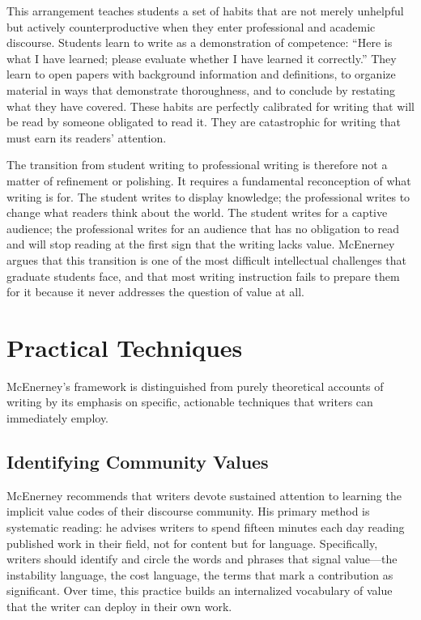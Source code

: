 \documentclass[12pt]{article}
\begin{document}
This arrangement teaches students a set of habits that are not merely unhelpful but actively counterproductive when they enter professional and academic discourse. Students learn to write as a demonstration of competence: ``Here is what I have learned; please evaluate whether I have learned it correctly.'' They learn to open papers with background information and definitions, to organize material in ways that demonstrate thoroughness, and to conclude by restating what they have covered. These habits are perfectly calibrated for writing that will be read by someone obligated to read it. They are catastrophic for writing that must earn its readers' attention.

The transition from student writing to professional writing is therefore not a matter of refinement or polishing. It requires a fundamental reconception of what writing is for. The student writes to display knowledge; the professional writes to change what readers think about the world. The student writes for a captive audience; the professional writes for an audience that has no obligation to read and will stop reading at the first sign that the writing lacks value. McEnerney argues that this transition is one of the most difficult intellectual challenges that graduate students face, and that most writing instruction fails to prepare them for it because it never addresses the question of value at all.

\section*{Practical Techniques}

McEnerney's framework is distinguished from purely theoretical accounts of writing by its emphasis on specific, actionable techniques that writers can immediately employ.

\subsection*{Identifying Community Values}

McEnerney recommends that writers devote sustained attention to learning the implicit value codes of their discourse community. His primary method is systematic reading: he advises writers to spend fifteen minutes each day reading published work in their field, not for content but for language. Specifically, writers should identify and circle the words and phrases that signal value---the instability language, the cost language, the terms that mark a contribution as significant. Over time, this practice builds an internalized vocabulary of value that the writer can deploy in their own work.
\end{document}
